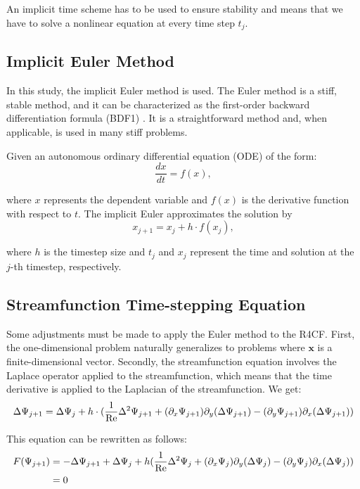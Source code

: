 An implicit time scheme has to be used to ensure stability and means that we
have to solve a nonlinear equation at every time step $t_j$. 

\subsection{Implicit Euler Method}

In this study, the implicit Euler method is used. The Euler method is a stiff,
stable method, and it can be characterized as the first-order backward
differentiation formula (BDF1) \citep{meseguer2020}. It is a straightforward
method and, when applicable, is used in many stiff problems.

Given an autonomous ordinary differential equation (ODE) of the form:
\begin{equation}
  \frac{{dx}}{{dt}} = f(x),
\end{equation}

where $x$ represents the dependent variable and
$f(x)$ is the derivative function with respect to $t$. The implicit Euler
approximates the solution by
\begin{equation}
  x_{j+1} = x_j + h \cdot f(x_j),
\end{equation}

where $h$ is the timestep size and
$t_j$ and $x_j$ represent the time and solution at the $j$-th timestep,
respectively.

\subsection{Streamfunction Time-stepping Equation}

Some adjustments must be made to apply the Euler method to the R4CF. First, the
one-dimensional problem naturally generalizes to problems where $\mathbf{x}$ is
a finite-dimensional vector. Secondly, the streamfunction equation involves the
Laplace operator applied to the streamfunction, which means that the time
derivative is applied to the Laplacian of the streamfunction. We get:  
\begin{align}
  \Delta\Psi_{j+1} = \Delta\Psi_j + h \cdot (\frac{1}{\mathrm{Re}}\Delta^2 \Psi_{j+1} +
  (\partial_x \Psi_{j+1}) \partial_y(\Delta \Psi_{j+1}) -
  (\partial_y \Psi_{j+1}) \partial_x(\Delta \Psi_{j+1})) \label{eq:str_timestepping}
\end{align}

This equation can be rewritten as follows:
\begin{align}
  F(\Psi_{j+1}) & = - \Delta\Psi_{j+1} + \Delta\Psi_j + h (\frac{1}{\mathrm{Re}}\Delta^2 \Psi_j +
    (\partial_x \Psi_j) \partial_y(\Delta \Psi_j) -
    (\partial_y \Psi_j) \partial_x(\Delta \Psi_j)) \nonumber \\
  & =  0 \label{eq:newton_ts}
\end{align}

